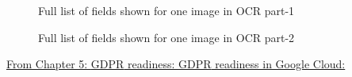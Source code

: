 \begin{itemize}
\begin{figure}[h!h]
      \caption{Full list of fields shown for one image in \acs{OCR} part-1}
      \label{textocrres1}
    \end{figure}
    \begin{figure}[h!h]
      \centering
      \caption{Full list of fields shown for one image in \acs{OCR} part-2}
      \label{textocrres2}
    \end{figure}
\end{itemize}

\clearpage
\newpage
\underline{From Chapter 5: \acs{GDPR} readiness: \acs{GDPR} readiness in Google Cloud:}
